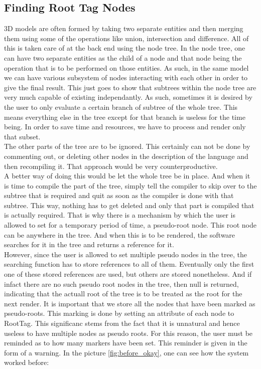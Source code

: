 \subsection{Finding Root Tag Nodes}
3D models are often formed by taking two separate entities and then merging them using some of the operations like union, intersection and difference. All of this is taken care of at the back end using the node tree. In the node tree, one can have two separate entities as the child of a node and that node being the operation that is to be performed on those entities. As such, in the same model we can have various subsystem of nodes interacting with each other in order to give the final result. This just goes to show that subtrees within the node tree are very much capable of existing independantly. As such, sometimes it is desired by the user to only evaluate a certain branch of subtree of the whole tree. This means everything else in the tree except for that branch is useless for the time being. In order to save time and resources, we have to process and render only that subset.\\
The other parts of the tree are to be ignored. This certainly can not be done by commenting out, or deleting other nodes in the description of the language and then recompiling it. That approach would be very counterproductive.\\
A better way of doing this would be let the whole tree be in place. And when it is time to compile the part of the tree, simply tell the compiler to skip over to the subtree that is required and quit as soon as the compiler is done with that subtree. This way, nothing has to get deleted and only that part is compiled that is actually required. That is why there is a mechanism by which the user is allowed to set for a temporary period of time, a pseudo-root node. This root node can be anywhere in the tree. And when this is to be rendered, the software searches for it in the tree and returns a reference for it.\\
However, since the user is allowed to set multiple pseudo nodes in the tree, the searching function has to store references to all of them. Eventually only the first one of these stored references are used, but others are stored nonetheless. And if infact there are no such pseudo root nodes in the tree, then null is returned, indicating that the actuall root of the tree is to be treated as the root for the next render. It is important that we store all the nodes that have been marked as pseudo-roots. This marking is done by setting an attribute of each node to RootTag. This significanc stems from the fact that it is unnatural and hence useless to have multiple nodes as pseudo roots. For this reason, the user must be reminded as to how many markers have been set. This reminder is given in the form of a warning. In the picture \ref{fig:before_okay}, one can see how the system worked before:\\
